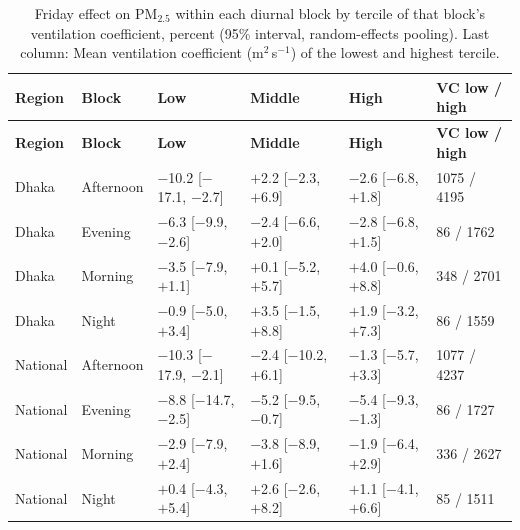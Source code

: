 \begingroup\footnotesize
\begin{longtable}{L{1.6cm} L{1.8cm} C{2.6cm} C{2.6cm} C{2.6cm} C{2.6cm}}
\caption{Friday effect on PM$_{2.5}$ within each diurnal block by tercile of that block's ventilation coefficient, percent (95\% interval, random-effects pooling). Last column: Mean ventilation coefficient (m$^2$\,s$^{-1}$) of the lowest and highest tercile.}\label{tab:s-vent}\\
\toprule
\textbf{Region} & \textbf{Block} & \textbf{Low} & \textbf{Middle} & \textbf{High} & \textbf{VC low / high} \\
\midrule\endfirsthead
\toprule
\textbf{Region} & \textbf{Block} & \textbf{Low} & \textbf{Middle} & \textbf{High} & \textbf{VC low / high} \\
\midrule\endhead
\bottomrule\endfoot
Dhaka & Afternoon & $-$10.2 {\scriptsize[$-$17.1, $-$2.7]} & $+$2.2 {\scriptsize[$-$2.3, $+$6.9]} & $-$2.6 {\scriptsize[$-$6.8, $+$1.8]} & 1075 / 4195 \\
Dhaka & Evening & $-$6.3 {\scriptsize[$-$9.9, $-$2.6]} & $-$2.4 {\scriptsize[$-$6.6, $+$2.0]} & $-$2.8 {\scriptsize[$-$6.8, $+$1.5]} & 86 / 1762 \\
Dhaka & Morning & $-$3.5 {\scriptsize[$-$7.9, $+$1.1]} & $+$0.1 {\scriptsize[$-$5.2, $+$5.7]} & $+$4.0 {\scriptsize[$-$0.6, $+$8.8]} & 348 / 2701 \\
Dhaka & Night & $-$0.9 {\scriptsize[$-$5.0, $+$3.4]} & $+$3.5 {\scriptsize[$-$1.5, $+$8.8]} & $+$1.9 {\scriptsize[$-$3.2, $+$7.3]} & 86 / 1559 \\
National & Afternoon & $-$10.3 {\scriptsize[$-$17.9, $-$2.1]} & $-$2.4 {\scriptsize[$-$10.2, $+$6.1]} & $-$1.3 {\scriptsize[$-$5.7, $+$3.3]} & 1077 / 4237 \\
National & Evening & $-$8.8 {\scriptsize[$-$14.7, $-$2.5]} & $-$5.2 {\scriptsize[$-$9.5, $-$0.7]} & $-$5.4 {\scriptsize[$-$9.3, $-$1.3]} & 86 / 1727 \\
National & Morning & $-$2.9 {\scriptsize[$-$7.9, $+$2.4]} & $-$3.8 {\scriptsize[$-$8.9, $+$1.6]} & $-$1.9 {\scriptsize[$-$6.4, $+$2.9]} & 336 / 2627 \\
National & Night & $+$0.4 {\scriptsize[$-$4.3, $+$5.4]} & $+$2.6 {\scriptsize[$-$2.6, $+$8.2]} & $+$1.1 {\scriptsize[$-$4.1, $+$6.6]} & 85 / 1511 \\
\end{longtable}
\endgroup
